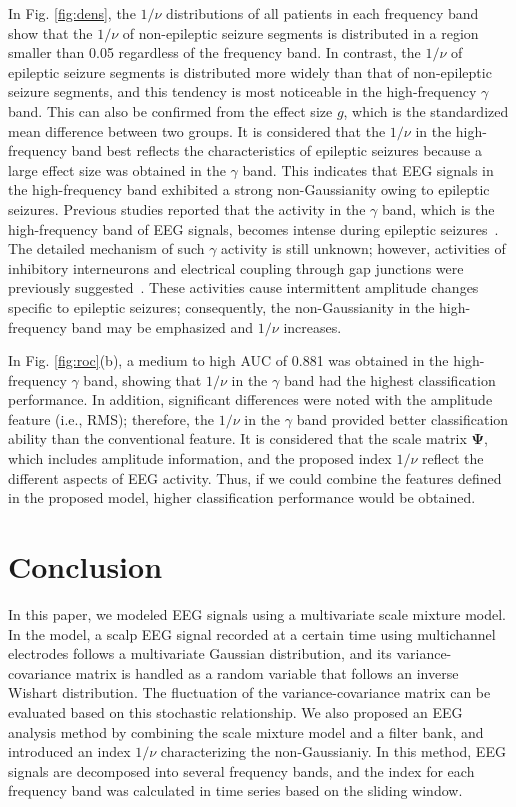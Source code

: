 \documentclass[journal]{IEEEtran}
\begin{document}
In Fig. \ref{fig:dens}, the $1/\nu$ distributions of all patients in each frequency band show that the $1/\nu$ of non-epileptic seizure segments is distributed in a region smaller than 0.05 regardless of the frequency band.
In contrast, the $1/\nu$ of epileptic seizure segments is distributed more widely than that of non-epileptic seizure segments, and this tendency is most noticeable in the high-frequency $\gamma$ band.
This can also be confirmed from the effect size $g$, which is the standardized mean difference between two groups.
It is considered that the $1/\nu$ in the high-frequency band best reflects the characteristics of epileptic seizures because a large effect size was obtained in the $\gamma$ band.
This indicates that EEG signals in the high-frequency band exhibited a strong non-Gaussianity owing to epileptic seizures.
Previous studies reported that the activity in the $\gamma$ band, which is the high-frequency band of EEG signals, becomes intense during epileptic seizures~\cite{Kobayashi2004,Kobayashi2009,Benedek2016}.
The detailed mechanism of such $\gamma$ activity is still unknown; however, activities of inhibitory interneurons and electrical coupling through gap junctions were previously suggested~\cite{Park2012}.
These activities cause intermittent amplitude changes specific to epileptic seizures; consequently, the non-Gaussianity in the high-frequency band may be emphasized and $1/\nu$ increases.

In Fig. \ref{fig:roc}(b), a medium to high AUC of 0.881 was obtained in the high-frequency $\gamma$ band, showing that $1/\nu$ in the $\gamma$ band had the highest classification performance. 
In addition, significant differences were noted with the amplitude feature (i.e., RMS); therefore, the $1/\nu$ in the $\gamma$ band provided better classification ability than the conventional feature. 
It is considered that the scale matrix $\mathbf{\Psi}$, which includes amplitude information, and the proposed index $1/\nu$ reflect the different aspects of EEG activity.
Thus, if we could combine the features defined in the proposed model, higher classification performance would be obtained.

\section{Conclusion}
In this paper, we modeled EEG signals using a multivariate scale mixture model.
In the model, a scalp EEG signal recorded at a certain time using multichannel electrodes follows a multivariate Gaussian distribution, and its variance-covariance matrix is handled as a random variable that follows an inverse Wishart distribution. 
The fluctuation of the variance-covariance matrix can be evaluated based on this stochastic relationship.
We also proposed an EEG analysis method by combining the scale mixture model and a filter bank, and introduced an index $1/\nu$ characterizing the non-Gaussianiy.
In this method, EEG signals are decomposed into several frequency bands, and the index for each frequency band was calculated in time series based on the sliding window.
\end{document}
